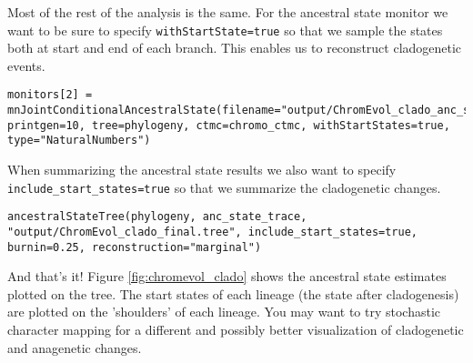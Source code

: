 Most of the rest of the analysis is the same.
For the ancestral state monitor we want to be sure to specify 
\texttt{withStartState=true} so that we sample the states both at
start and end of each branch. This enables us to reconstruct cladogenetic events.
{\tt \begin{snugshade*}
\begin{lstlisting}
monitors[2] = mnJointConditionalAncestralState(filename="output/ChromEvol_clado_anc_states.log", printgen=10, tree=phylogeny, ctmc=chromo_ctmc, withStartStates=true, type="NaturalNumbers")
\end{lstlisting}
\end{snugshade*}}
When summarizing the ancestral state results we also want to specify 
\texttt{include\_start\_states=true} so that we summarize the cladogenetic changes.
{\tt \begin{snugshade*}
\begin{lstlisting}
ancestralStateTree(phylogeny, anc_state_trace, "output/ChromEvol_clado_final.tree", include_start_states=true, burnin=0.25, reconstruction="marginal")
\end{lstlisting}
\end{snugshade*}}
And that's it!
Figure \ref{fig:chromevol_clado} shows the ancestral state estimates plotted on the
tree. The start states of each lineage (the state after cladogenesis) are plotted
on the 'shoulders' of each lineage.
You may want to try stochastic character mapping for a different and possibly better
visualization of cladogenetic and anagenetic changes.


\newpage
